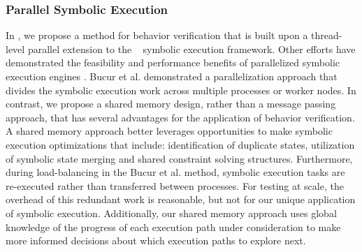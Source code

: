 \subsubsection{Parallel Symbolic Execution}
In , we propose a method for behavior verification that
is built upon a thread-level parallel extension to
the \klee~\cite{cadar08:klee} symbolic execution framework. Other efforts have demonstrated the
feasibility and performance benefits of parallelized symbolic
execution engines \cite{bucur11:parallel, siddiqui10:parsym,
staats10:pse}. Bucur et al. demonstrated a parallelization approach
that divides the symbolic execution work across multiple processes or
worker nodes. In contrast, we propose a shared memory design, rather
than a message passing approach, that has several advantages for the
application of behavior verification. A shared memory approach better leverages opportunities
to make symbolic execution optimizations that include: identification
of duplicate states, utilization of symbolic state merging and shared
constraint solving structures. 
Furthermore, during load-balancing in the Bucur et al. method,
symbolic execution tasks are re-executed rather than transferred
between processes. For testing at scale, the overhead of this
redundant work is reasonable,
but not for our unique application of symbolic execution.
Additionally, our shared memory approach uses
global knowledge of the progress of each execution path
under consideration to make more informed decisions
about which execution paths to explore next.

